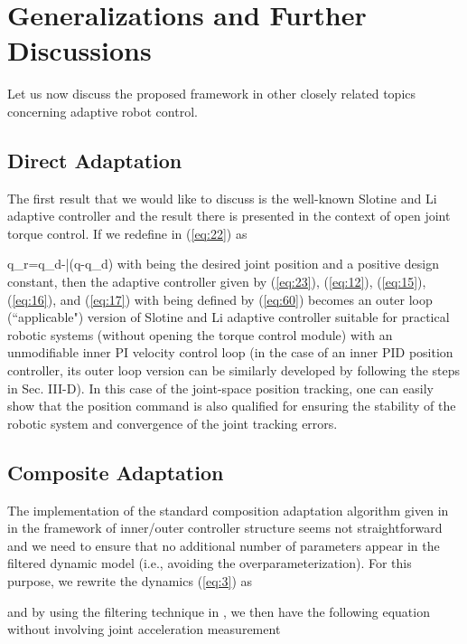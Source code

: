 \documentclass[9pt,technote]{IEEEtran}
\def \be {}
\begin{document}
{\begin{enumerate}
\end{enumerate}

\section{Generalizations and Further Discussions}

Let us now discuss the proposed framework in other closely related topics concerning adaptive robot control.

\subsection{Direct Adaptation}

The first result that we would like to discuss is the well-known Slotine and Li adaptive controller \cite{Slotine1987_IJRR} and the result there is presented in the context of open joint torque control. If we redefine  in (\ref{eq:22}) as
\be
\label{eq:60}
\dot q_r=\dot q_d-\bar\alpha (q-q_d)
\ee with  being the desired joint position and  a positive design constant, then the adaptive controller given by
(\ref{eq:23}), (\ref{eq:12}), (\ref{eq:15}), (\ref{eq:16}), and (\ref{eq:17}) with  being defined by (\ref{eq:60}) becomes an outer loop (``applicable") version of Slotine and Li adaptive controller suitable for practical robotic systems (without opening the torque control module) with an unmodifiable inner PI velocity control loop (in the case of an inner PID position controller, its outer loop version can be similarly developed by following the steps in Sec. III-D). In this case of the joint-space position tracking, one can easily show that the position command  is also qualified for ensuring the stability of the robotic system and convergence of the joint tracking errors.


\subsection{Composite Adaptation}

The implementation of the standard composition adaptation algorithm given in \cite{Slotine1989_Aut} in the framework of inner/outer controller structure seems not straightforward and we need to ensure that no additional number of parameters appear in the filtered dynamic model (i.e., avoiding the overparameterization). For this purpose, we rewrite the dynamics (\ref{eq:3}) as

and by using the filtering technique in \cite{Slotine1989_Aut}, we then have the following equation without involving joint acceleration measurement

}
\end{document}
